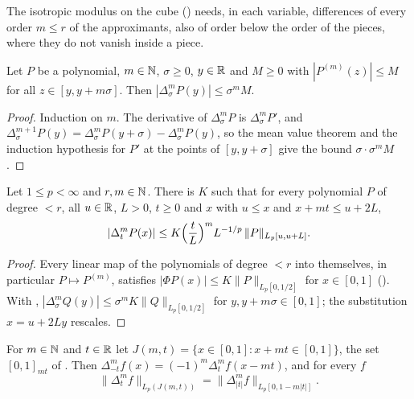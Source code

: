 The isotropic modulus on the cube () needs, in each variable, differences of
every order $m \leq r$ of the approximants, also of order below the order of the pieces, where
they do not vanish inside a piece.

\begin{lemma}
\label{lem:poly-diff-deriv}
\leanok
{}
Let $P$ be a polynomial, $m \in \mathbb{N}$, $\sigma \geq 0$, $y \in \mathbb{R}$ and $M \geq 0$ with
$|P^{(m)}(z)| \leq M$ for all $z \in [y, y + m \sigma]$. Then
$|\Delta_\sigma^m P(y)| \leq \sigma^m M$.
\end{lemma}

\begin{proof}
\leanok
Induction on $m$. The derivative of $\Delta_\sigma^m P$ is $\Delta_\sigma^m P'$, and
$\Delta_\sigma^{m+1} P(y) = \Delta_\sigma^m P(y + \sigma) - \Delta_\sigma^m P(y)$, so the mean
value theorem and the induction hypothesis for $P'$ at the points of $[y, y + \sigma]$ give the
bound $\sigma \cdot \sigma^m M$.
\end{proof}

\begin{lemma}
\label{lem:diff-bound}
\leanok
{}
Let $1 \leq p < \infty$ and $r, m \in \mathbb{N}$. There is $K$ such that for every polynomial $P$ of
degree $< r$, all $u \in \mathbb{R}$, $L > 0$, $t \geq 0$ and $x$ with $u \leq x$ and
$x + mt \leq u + 2L$,
\[
  |\Delta_t^m P(x)| \leq K \Bigl(\frac{t}{L}\Bigr)^m L^{-1/p} \, \|P\|_{L_p[u, u + L]} .
\]
\end{lemma}

\begin{proof}
\leanok
Every linear map of the polynomials of degree $< r$ into themselves, in particular
$P \mapsto P^{(m)}$, satisfies $|\Phi P(x)| \leq K \|P\|_{L_p[0, 1/2]}$ for $x \in [0, 1]$
(). With
, $|\Delta_\sigma^m Q(y)| \leq \sigma^m K \|Q\|_{L_p[0,1/2]}$ for
$y, y + m\sigma \in [0, 1]$; the substitution $x = u + 2Ly$ rescales.
\end{proof}

\begin{lemma}
\label{lem:step-regions}
\leanok
{}
For $m \in \mathbb{N}$ and $t \in \mathbb{R}$ let $J(m, t) = \{x \in [0, 1] : x + mt \in [0, 1]\}$, the set
$[0, 1]_{mt}$ of . Then $\Delta_{-t}^m f(x) = (-1)^m \Delta_t^m f(x - mt)$,
and for every $f$
\[
  \|\Delta_t^m f\|_{L_p(J(m,t))} = \|\Delta_{|t|}^m f\|_{L_p[0, 1 - m|t|]} .
\]
\end{lemma}

